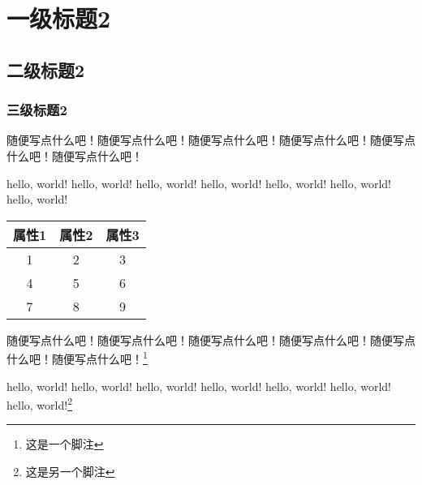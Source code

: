 \chapter{一级标题2}
\section{二级标题2}
\subsection{三级标题2}
随便写点什么吧！随便写点什么吧！随便写点什么吧！随便写点什么吧！随便写点什么吧！随便写点什么吧！

hello, world! hello, world! hello, world! hello, world! hello, world! hello, world! hello, world!

\begin{table}[h]

\begin{center}
    \begin{tabular}{ccc} 
    \toprule
    \textbf{属性1} & \textbf{属性2} & \textbf{属性3} \\ \midrule
    1            & 2            & 3            \\
    4            & 5            & 6            \\
    7            & 8            & 9            \\ \bottomrule
    \end{tabular}
\end{center}

\end{table}

随便写点什么吧！随便写点什么吧！随便写点什么吧！随便写点什么吧！随便写点什么吧！随便写点什么吧！\footnote{这是一个脚注}

hello, world! hello, world! hello, world! hello, world! hello, world! hello, world! hello, world!\footnote{这是另一个脚注}